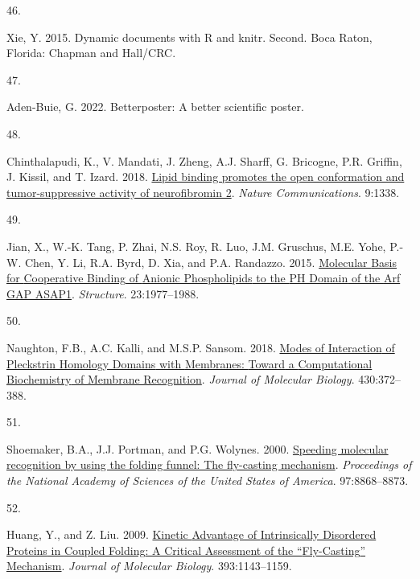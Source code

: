 \documentclass[
  twocolumn]{biophys-new-mod}
\newlength{\cslhangindent}
\newlength{\csllabelwidth}
\newlength{\cslentryspacingunit} %
\newenvironment{CSLReferences}[2] %
 {%
  \setlength{\parindent}{0pt}
  \ifodd #1
  \let\oldpar\par
  \def\par{\hangindent=\cslhangindent\oldpar}
  \fi
  \setlength{\parskip}{#2\cslentryspacingunit}
 }%
 {}
\newcommand{\CSLLeftMargin}[1]{\parbox[t]{\csllabelwidth}{#1}}
\newcommand{\CSLRightInline}[1]{\parbox[t]{\linewidth - \csllabelwidth}{#1}\break}
\begin{document}
\begin{CSLReferences}{0}{0}
\leavevmode{}%
\CSLLeftMargin{46. }%
\CSLRightInline{Xie, Y. 2015. Dynamic documents with {R} and knitr.
Second. {Boca Raton, Florida}: {Chapman and Hall/CRC}.}

\leavevmode{}%
\CSLLeftMargin{47. }%
\CSLRightInline{Aden-Buie, G. 2022. Betterposter: {A} better scientific
poster.}

\leavevmode{}%
\CSLLeftMargin{48. }%
\CSLRightInline{Chinthalapudi, K., V. Mandati, J. Zheng, A.J. Sharff, G.
Bricogne, P.R. Griffin, J. Kissil, and T. Izard. 2018.
\href{https://doi.org/10.1038/s41467-018-03648-4}{Lipid binding promotes
the open conformation and tumor-suppressive activity of neurofibromin
2}. \emph{Nature Communications}. 9:1338.}

\leavevmode{}%
\CSLLeftMargin{49. }%
\CSLRightInline{Jian, X., W.-K. Tang, P. Zhai, N.S. Roy, R. Luo, J.M.
Gruschus, M.E. Yohe, P.-W. Chen, Y. Li, R.A. Byrd, D. Xia, and P.A.
Randazzo. 2015.
\href{https://doi.org/10.1016/j.str.2015.08.008}{Molecular {Basis} for
{Cooperative Binding} of {Anionic Phospholipids} to the {PH Domain} of
the {Arf GAP ASAP1}}. \emph{Structure}. 23:1977--1988.}

\leavevmode{}%
\CSLLeftMargin{50. }%
\CSLRightInline{Naughton, F.B., A.C. Kalli, and M.S.P. Sansom. 2018.
\href{https://doi.org/10.1016/j.jmb.2017.12.011}{Modes of {Interaction}
of {Pleckstrin Homology Domains} with {Membranes}: {Toward} a
{Computational Biochemistry} of {Membrane Recognition}}. \emph{Journal
of Molecular Biology}. 430:372--388.}

\leavevmode{}%
\CSLLeftMargin{51. }%
\CSLRightInline{Shoemaker, B.A., J.J. Portman, and P.G. Wolynes. 2000.
\href{https://doi.org/10.1073/pnas.160259697}{Speeding molecular
recognition by using the folding funnel: The fly-casting mechanism}.
\emph{Proceedings of the National Academy of Sciences of the United
States of America}. 97:8868--8873.}

\leavevmode{}%
\CSLLeftMargin{52. }%
\CSLRightInline{Huang, Y., and Z. Liu. 2009.
\href{https://doi.org/10.1016/j.jmb.2009.09.010}{Kinetic {Advantage} of
{Intrinsically Disordered Proteins} in {Coupled
Folding}\textendash{{Binding Process}}: {A Critical Assessment} of the
{``{Fly-Casting}''} {Mechanism}}. \emph{Journal of Molecular Biology}.
393:1143--1159.}


\end{CSLReferences}
\end{document}
